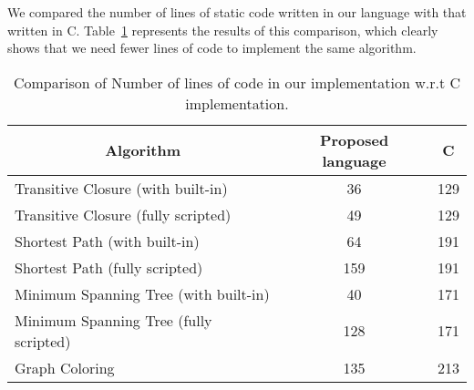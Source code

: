  We compared the number of lines of static code written in our language with 
 that written in C.  Table~\ref{table:eval_4} represents the results of this 
 comparison, which clearly shows that we need fewer lines of code to implement 
 the same algorithm.

 \begin{table}[h]
\centering
\caption{Comparison of Number of lines of code in our implementation w.r.t C implementation.}
\label{table:eval_4}
\begin{tabular}{|l|c|c|}
\hline
\multicolumn{1}{|c|}{Algorithm} & Proposed language & C   \\ \hline
Transitive Closure (with built-in)              & 36                & 129 \\ \hline
Transitive Closure (fully scripted)              & 49                & 129 \\ \hline
Shortest Path (with built-in)                  & 64                & 191 \\ \hline
Shortest Path (fully scripted)                  & 159                & 191 \\ \hline
Minimum Spanning Tree (with built-in)           & 40                & 171 \\ \hline
Minimum Spanning Tree (fully scripted)          & 128                & 171 \\ \hline
Graph Coloring                  & 135               & 213 \\ \hline
\end{tabular}
\end{table}
